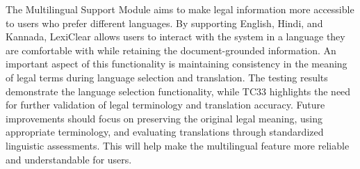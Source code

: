 \documentclass[12pt,a4paper,oneside]{report}
\begin{document}
The Multilingual Support Module aims to make legal information more accessible to users who prefer different languages. By supporting English, Hindi, and Kannada, LexiClear allows users to interact with the system in a language they are comfortable with while retaining the document-grounded information. An important aspect of this functionality is maintaining consistency in the meaning of legal terms during language selection and translation. The testing results demonstrate the language selection functionality, while TC33 highlights the need for further validation of legal terminology and translation accuracy. Future improvements should focus on preserving the original legal meaning, using appropriate terminology, and evaluating translations through standardized linguistic assessments. This will help make the multilingual feature more reliable and understandable for users.


\end{document}
